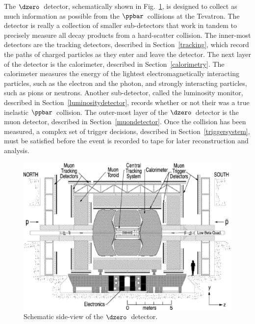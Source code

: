The $\dzero$~detector, schematically shown in Fig.~\ref{D0}, is designed to collect as much information as possible from the $\ppbar$~collisions at the Tevatron. The detector is really a collection of smaller sub-detectors that work in tandem to precisely measure all decay products from a hard-scatter collision. The inner-most detectors are the tracking detectors, described in Section~\ref{tracking}, which record the paths of charged particles as they enter and leave the detector. The next layer of the detector is the calorimeter, described in Section~\ref{calorimetry}. The calorimeter measures the energy of the lightest electromagnetically interacting particles, such as the electron and the photon, and strongly interacting particles, such as pions or neutrons. Another sub-detector, called the luminosity monitor, described in Section~\ref{luminositydetector}, records whether or not their was a true inelastic $\ppbar$~collision. The outer-most layer of the $\dzero$~detector is the muon detector, described in Section~\ref{muondetector}. Once the collision has been measured, a complex set of trigger decisions, described in Section~\ref{triggersystem}, must be satisfied before the event is recorded to tape for later reconstruction and analysis.


\begin{figure}[!h!tbp]
\begin{center}
\includegraphics[width=1.0\textwidth]{eps/D0/DetectorSlice2.eps}
\end{center}
\vspace{-0.1in}
\caption{Schematic side-view of the $\dzero$~detector.}
\label{D0}
\end{figure}

